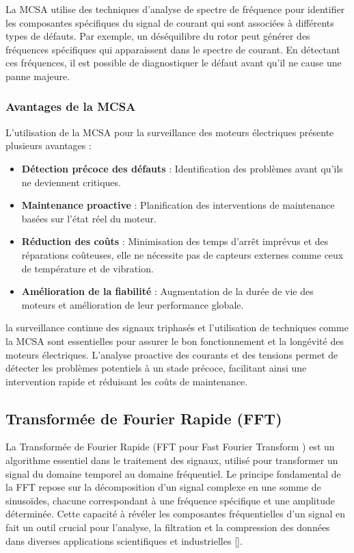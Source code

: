 La MCSA utilise des techniques d'analyse de spectre de fréquence pour
identifier les composantes spécifiques du signal de courant qui sont associées
à différents types de défauts. Par exemple, un déséquilibre du rotor peut
générer des fréquences spécifiques qui apparaissent dans le spectre de courant.
En détectant ces fréquences, il est possible de diagnostiquer le défaut avant
qu'il ne cause une panne majeure.

\subsubsection*{Avantages de la MCSA}

L'utilisation de la MCSA pour la surveillance des moteurs électriques présente
plusieurs avantages :
\begin{itemize}
	\item \textbf{Détection précoce des défauts} : Identification des problèmes avant qu'ils ne deviennent critiques.
	\item \textbf{Maintenance proactive} : Planification des interventions de maintenance basées sur l'état réel du moteur.
	\item \textbf{Réduction des coûts} : Minimisation des temps d'arrêt imprévus et des réparations coûteuses,
	      elle ne nécessite pas de capteurs externes comme ceux de température et de vibration.
	\item \textbf{Amélioration de la fiabilité} : Augmentation de la durée de vie des moteurs et amélioration de leur performance globale.
\end{itemize}

la surveillance continue des signaux triphasés et l'utilisation de techniques
comme la MCSA sont essentielles pour assurer le bon fonctionnement et la
longévité des moteurs électriques. L'analyse proactive des courants et des
tensions permet de détecter les problèmes potentiels à un stade précoce,
facilitant ainsi une intervention rapide et réduisant les coûts de maintenance.

\subsection{Transformée de Fourier Rapide (FFT)}

La Transformée de Fourier Rapide (FFT pour Fast Fourier Transform ) est un
algorithme essentiel dans le traitement des signaux, utilisé pour transformer
un signal du domaine temporel au domaine fréquentiel. Le principe fondamental
de la FFT repose sur la décomposition d'un signal complexe en une somme de
sinusoïdes, chacune correspondant à une fréquence spécifique et une amplitude
déterminée. Cette capacité à révéler les composantes fréquentielles d'un signal
en fait un outil crucial pour l'analyse, la filtration et la compression des
données dans diverses applications scientifiques et industrielles
	[\cite{duhamel_vetterli_1989}].

